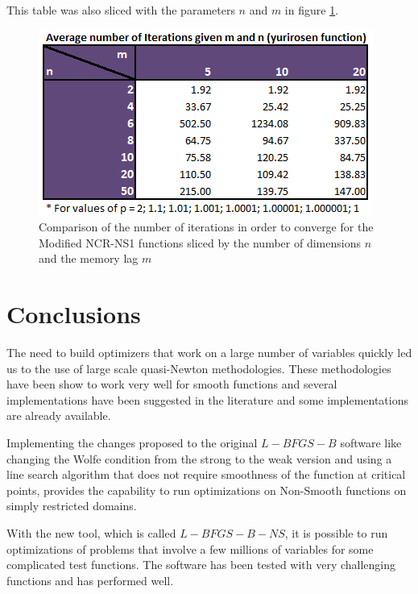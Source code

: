This table was also sliced with the parameters $n$ and $m$ in figure \ref{yurimn}.

\begin{figure}
\begin{center}
\includegraphics[scale=0.9]{Figures/yurirosenmn.PNG}
\caption[Comparison of selected values of the Modified NCR-NS1 function sliced by m and n]{Comparison of the number of iterations in order to converge for the Modified NCR-NS1 functions sliced by the number of dimensions $n$ and the memory lag $m$}
\label{yurimn}
\end{center}
\end{figure} 

\chapter{Conclusions}

The need to build optimizers that work on a large number of variables quickly led us to the use of large scale quasi-Newton methodologies. These methodologies have been show to work very well for smooth functions and several implementations have been suggested in the literature and some implementations are already available.

Implementing the changes proposed to the original $L-BFGS-B$ software like changing the Wolfe condition from the strong to the weak version and using a line search algorithm that does not require smoothness of the function at critical points, provides the capability to run optimizations on Non-Smooth functions on simply restricted domains.

With the new tool, which is called $L-BFGS-B-NS$, it is possible to run optimizations of problems that involve a few millions of variables for some complicated test functions. The software has been tested with very challenging functions and has performed well.

